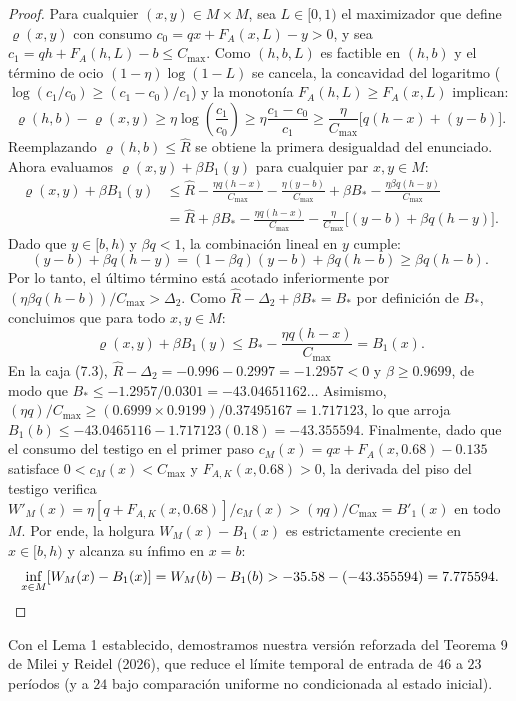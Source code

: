 \documentclass[11pt,letterpaper]{article}
\theoremstyle{plain}
\begin{document}
\begin{proof}
Para cualquier $(x,y)\in M\times M$, sea $L\in[0,1)$ el maximizador que define $\varrho(x,y)$ con consumo $c_0=qx+F_A(x,L)-y>0$, y sea $c_1=qh+F_A(h,L)-b\le C_{\max}$. Como $(h,b,L)$ es factible en $(h,b)$ y el término de ocio $(1-\eta)\log(1-L)$ se cancela, la concavidad del logaritmo ($\log(c_1/c_0)\ge (c_1-c_0)/c_1$) y la monotonía $F_A(h,L)\ge F_A(x,L)$ implican:
\[
\varrho(h,b) - \varrho(x,y) \ge \eta\log\!\left(\frac{c_1}{c_0}\right) \ge \eta\frac{c_1-c_0}{c_1} \ge \frac{\eta}{C_{\max}}\big[q(h-x)+(y-b)\big].
\]
Reemplazando $\varrho(h,b)\le\widehat{R}$ se obtiene la primera desigualdad del enunciado. Ahora evaluamos $\varrho(x,y)+\beta B_1(y)$ para cualquier par $x,y\in M$:
\begin{align*}
\varrho(x,y) + \beta B_1(y) &\le \widehat{R} - \frac{\eta q(h-x)}{C_{\max}} - \frac{\eta(y-b)}{C_{\max}} + \beta B_* - \frac{\eta\beta q(h-y)}{C_{\max}}\\
&= \widehat{R} + \beta B_* - \frac{\eta q(h-x)}{C_{\max}} - \frac{\eta}{C_{\max}}\big[(y-b) + \beta q(h-y)\big].
\end{align*}
Dado que $y\in[b,h)$ y $\beta q<1$, la combinación lineal en $y$ cumple:
\[
(y-b)+\beta q(h-y) = (1-\beta q)(y-b)+\beta q(h-b) \ge \beta q(h-b).
\]
Por lo tanto, el último término está acotado inferiormente por $(\eta\beta q(h-b))/C_{\max} > \Delta_2$. Como $\widehat{R}-\Delta_2+\beta B_* = B_*$ por definición de $B_*$, concluimos que para todo $x,y\in M$:
\[
\varrho(x,y)+\beta B_1(y) \le B_* - \frac{\eta q(h-x)}{C_{\max}} = B_1(x).
\]
En la caja (7.3), $\widehat{R}-\Delta_2 = -0.996 - 0.2997 = -1.2957 < 0$ y $\beta\ge 0.9699$, de modo que $B_* \le -1.2957/0.0301 = -43.04651162\ldots$ Asimismo, $(\eta q)/C_{\max} \ge (0.6999\times 0.9199)/0.37495167 = 1.717123$, lo que arroja $B_1(b)\le -43.0465116 - 1.717123(0.18) = -43.355594$. Finalmente, dado que el consumo del testigo en el primer paso $c_M(x)=qx+F_A(x,0.68)-0.135$ satisface $0<c_M(x)<C_{\max}$ y $F_{A,K}(x,0.68)>0$, la derivada del piso del testigo verifica $W'_M(x)=\eta[q+F_{A,K}(x,0.68)]/c_M(x) > (\eta q)/C_{\max} = B'_1(x)$ en todo $M$. Por ende, la holgura $W_M(x)-B_1(x)$ es estrictamente creciente en $x\in[b,h)$ y alcanza su ínfimo en $x=b$:
\[
\inf_{x\in M}[W_M(x)-B_1(x)] = W_M(b)-B_1(b) > -35.58 - (-43.355594) = 7.775594. \qedhere
\]
\end{proof}

Con el Lema 1 establecido, demostramos nuestra versión reforzada del Teorema 9 de Milei y Reidel (2026), que reduce el límite temporal de entrada de $46$ a $23$ períodos (y a $24$ bajo comparación uniforme no condicionada al estado inicial).
\end{document}
